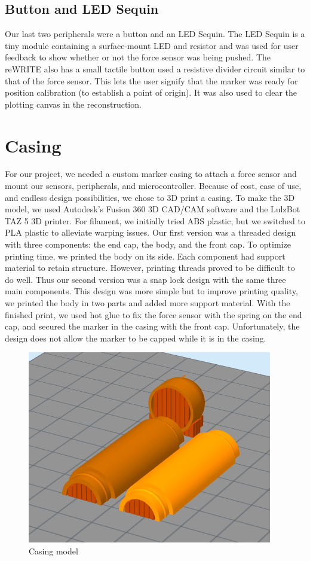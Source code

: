 \documentclass[12pt,journal]{IEEEtran}
\begin{document}
\subsection{Button and LED Sequin}
	Our last two peripherals were a button and an LED Sequin. The LED Sequin is a tiny module containing a surface-mount LED and resistor and was used for user feedback to show whether or not the force sensor was being pushed. The reWRITE also has a small tactile button used a resistive divider circuit similar to that of the force sensor. This lets the user signify that the marker was ready for position calibration (to establish a point of origin). It was also used to clear the plotting canvas in the reconstruction.

\section{Casing}
	For our project, we needed a custom marker casing to attach a force sensor and mount our sensors, peripherals, and microcontroller. Because of cost, ease of use, and endless design possibilities, we chose to 3D print a casing. To make the 3D model, we used Autodesk’s Fusion 360 3D CAD/CAM software and the LulzBot TAZ 5 3D printer. For filament, we initially tried ABS plastic, but we switched to PLA plastic to alleviate warping issues.
	Our first version was a threaded design with three components: the end cap, the body, and the front cap. To optimize printing time, we printed the body on its side. Each component had support material to retain structure. However, printing threads proved to be difficult to do well. Thus our second version was a snap lock design with the same three main components. This design was more simple but to improve printing quality, we printed the body in two parts and added more support material. 
With the finished print, we used hot glue to fix the force sensor with the spring on the end cap, and secured the marker in the casing with the front cap. Unfortunately, the design does not allow the marker to be capped while it is in the casing.

\begin{figure}[h]
  \centering
    \includegraphics[width=0.6\linewidth]{figures/3d-model}
  \caption{Casing model}
  \label{fig:3d-model}
\end{figure}
\end{document}
